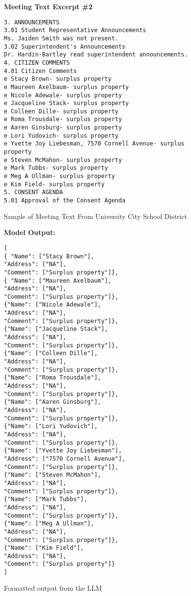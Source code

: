 \begin{figure}[H]
\centering
\textbf{Meeting Text Excerpt \#2}\par\medskip
\begin{lstlisting}[]
3. ANNOUNCEMENTS
3.01 Student Representative Announcements
Ms. Jaiden Smith was not present.
3.02 Superintendent's Announcements
Dr. Hardin-Bartley read superintendent announcements.
4. CITIZEN COMMENTS
4.01 Citizen Comments
e Stacy Brown- surplus property
e Maureen Axelbaum- surplus property
e Nicole Adewale- surplus property
e Jacqueline Stack- surplus property
e Colleen Dille- surplus property
e Roma Trousdale- surplus property
e Aaren Ginsburg- surplus property
e Lori Yudovich- surplus property
e Yvette Joy Liebesman, 7570 Cornell Avenue- surplus property
e Steven McMahon- surplus property
e Mark Tubbs- surplus property
e Meg A Ullman- surplus property
e Kim Field- surplus property
5. CONSENT AGENDA
5.01 Approval of the Consent Agenda
\end{lstlisting}
\caption[Meeting Text Example \#2]{Sample of Meeting Text From University City School District}
\end{figure}

\begin{figure}[H]
\centering
\textbf{Model Output:}\par\medskip
\begin{lstlisting}[]
[
{ "Name": ["Stacy Brown"], 
"Address": ["NA"],
"Comment": ["Surplus property"]},
{ "Name": ["Maureen Axelbaum"],
"Address": ["NA"],
"Comment": ["Surplus property"]},
{"Name": ["Nicole Adewale"],
"Address": ["NA"],
"Comment": ["Surplus property"]},
{"Name": ["Jacqueline Stack"],
"Address": ["NA"],
"Comment": ["Surplus property"]},
{"Name": ["Colleen Dille"],
"Address": ["NA"],
"Comment": ["Surplus property"]},
{"Name": ["Roma Trousdale"],
"Address": ["NA"],
"Comment": ["Surplus property"]},
{"Name": ["Aaren Ginsburg"],
"Address": ["NA"],
"Comment": ["Surplus property"]},
{"Name": ["Lori Yudovich"],
"Address": ["NA"],
"Comment": ["Surplus property"]},
{"Name": ["Yvette Joy Liebesman"],
"Address": ["7570 Cornell Avenue"],
"Comment": ["Surplus property"]},
{"Name": ["Steven McMahon"],
"Address": ["NA"],
"Comment": ["Surplus property"]},
{"Name": ["Mark Tubbs"],
"Address": ["NA"],
"Comment": ["Surplus property"]},
{"Name": ["Meg A Ullman"],
"Address": ["NA"],
"Comment": ["Surplus property"]},
{"Name": ["Kim Field"],
"Address": ["NA"],
"Comment": ["Surplus property"]}
]
\end{lstlisting}
\caption[Meeting Text Example Output \#2]{Formatted output from the LLM}
\end{figure}

